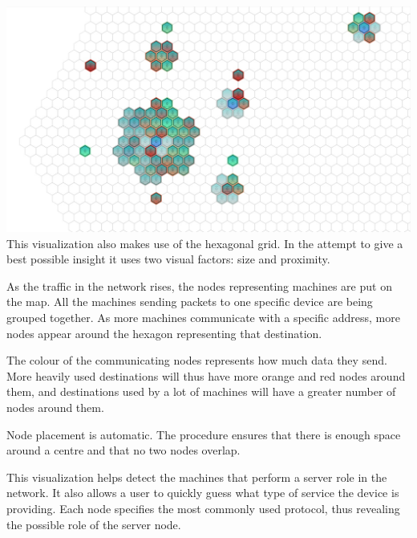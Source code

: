 \includegraphics[width=\linewidth]{materials/groups.jpg}
This visualization also makes use of the hexagonal grid. In the attempt to give a best possible insight
it uses two visual factors: size and proximity.

As the traffic in the network rises, the nodes representing machines are put on the map.
All the machines sending packets to one specific device are being grouped together.
As more machines communicate with a specific address, more nodes appear around the hexagon representing that destination.

The colour of the communicating nodes represents how much data they send. More heavily used destinations 
will thus have more orange and red nodes around them, and destinations used by a lot of machines will have a greater number of nodes around them.

Node placement is automatic. The procedure ensures that there is enough space around a centre and that no two nodes overlap.

This visualization helps detect the machines that perform a server role in the network.
It also allows a user to quickly guess what type of service the device is providing. Each node specifies the
most commonly used protocol, thus revealing the possible role of the server node.
